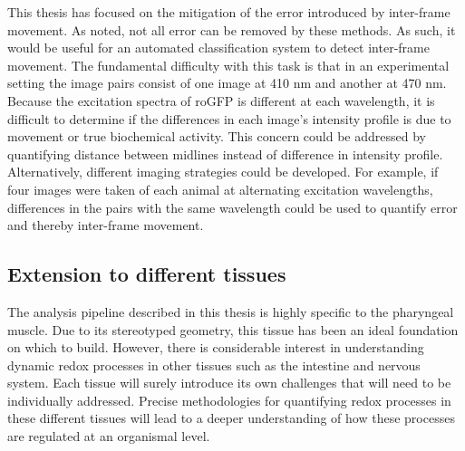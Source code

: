 This thesis has focused on the mitigation of the error introduced by inter-frame movement. As noted, not all error can be removed by these methods. As such, it would be useful for an automated classification system to detect inter-frame movement. The fundamental difficulty with this task is that in an experimental setting the image pairs consist of one image at 410 nm and another at 470 nm. Because the excitation spectra of roGFP is different at each wavelength, it is difficult to determine if the differences in each image's intensity profile is due to movement or true biochemical activity. This concern could be addressed by quantifying distance between midlines instead of difference in intensity profile. Alternatively, different imaging strategies could be developed. For example, if four images were taken of each animal at alternating excitation wavelengths, differences in the pairs with the same wavelength could be used to quantify error and thereby inter-frame movement.

\subsection{Extension to different tissues}

The analysis pipeline described in this thesis is highly specific to the pharyngeal muscle. Due to its stereotyped geometry, this tissue has been an ideal foundation on which to build. However, there is considerable interest in understanding dynamic redox processes in other tissues such as the intestine and nervous system. Each tissue will surely introduce its own challenges that will need to be individually addressed. Precise methodologies for quantifying redox processes in these different tissues will lead to a deeper understanding of how these processes are regulated at an organismal level.

